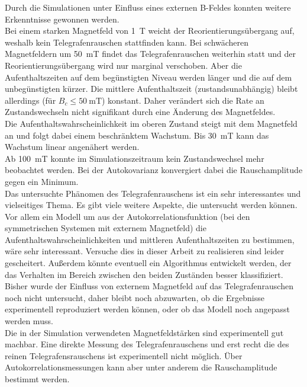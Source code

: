 \documentclass[main.tex]{subfiles}
\begin{document}
Durch die Simulationen unter Einfluss eines externen B-Feldes konnten weitere Erkenntnisse gewonnen werden.\\
Bei einem starken Magnetfeld von \SI{1}{\tesla} weicht der Reorientierungsübergang auf, weshalb kein Telegrafenrauschen stattfinden kann. Bei schwächeren Magnetfeldern um \SI{50}{\milli\tesla} findet das Telegrafenrauschen weiterhin statt und der Reorientierungsübergang wird nur marginal verschoben. Aber die Aufenthaltszeiten auf dem begünstigten Niveau werden länger und die auf dem unbegünstigten kürzer. Die mittlere Aufenthaltszeit (zustandsunabhängig) bleibt allerdings (für \(B_c \leq \SI{50}{\milli\tesla}\)) konstant. Daher verändert sich die Rate an Zustandswechseln nicht signifikant durch eine Änderung des Magnetfeldes.\\
Die Aufenthaltswahrscheinlichkeit im oberen Zustand steigt mit dem Magnetfeld an und folgt dabei einem beschränktem Wachstum. Bis \SI{30}{\milli\tesla} kann das Wachstum linear angenähert werden.\\ 
Ab \SI{100}{\milli\tesla} konnte im Simulationszeitraum kein Zustandswechsel mehr beobachtet werden. Bei der Autokovarianz konvergiert dabei die Rauschamplitude gegen ein Minimum. \\


Das untersuchte Phänomen des Telegrafenrauschens ist ein sehr interessantes und vielseitiges Thema. Es gibt viele weitere Aspekte, die untersucht werden können.\\
Vor allem ein Modell um aus der Autokorrelationsfunktion (bei den symmetrischen Systemen mit externem Magnetfeld) die Aufenthaltswahrscheinlichkeiten und mittleren Aufenthaltszeiten zu bestimmen, wäre sehr interessant. Versuche dies in dieser Arbeit zu realisieren sind leider gescheitert.
Außerdem könnte eventuell ein Algorithmus entwickelt werden, der das Verhalten im Bereich zwischen den beiden Zuständen besser klassifiziert.\\

Bisher wurde der Einfluss von externem Magnetfeld auf das Telegrafenrauschen noch nicht untersucht, daher bleibt noch abzuwarten, ob die Ergebnisse experimentell reproduziert werden können, oder ob das Modell noch angepasst werden muss.\\
Die in der Simulation verwendeten Magnetfeldstärken sind experimentell gut machbar. Eine direkte Messung des Telegrafenrauschens und erst recht die des reinen Telegrafensrauschens ist experimentell nicht möglich. Über Autokorrelationsmessungen kann aber unter anderem die Rauschamplitude bestimmt werden.\\
\end{document}
